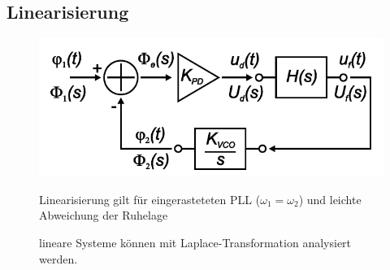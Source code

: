 \subsection{Linearisierung }
\begin{figure}[h!]
	\begin{minipage}{0.5\textwidth} 
       \includegraphics[width=1\textwidth]{images/linear_PLL}
	\end{minipage}
	\begin{minipage}{0.4\textwidth} 
       \begin{compactitem}
          \item Linearisierung gilt für eingerasteteten PLL ($\omega_1 = \omega_2$) und leichte Abweichung der Ruhelage
          \item lineare Systeme können mit Laplace-Transformation analysiert werden.
       \end{compactitem}
	\end{minipage}
\end{figure}

\FloatBarrier
